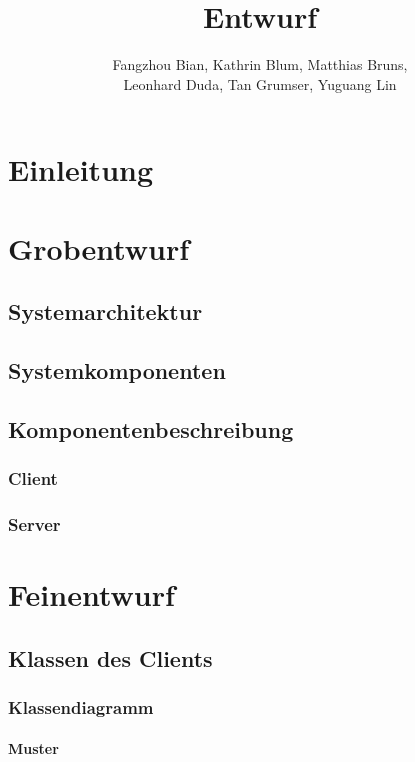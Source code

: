 \documentclass[a4paper]{scrreprt}
\begin{document}
\title{Entwurf}
\author{Fangzhou Bian, Kathrin Blum, Matthias Bruns, \\Leonhard Duda, Tan Grumser, Yuguang Lin}
\maketitle
\tableofcontents



\chapter{Einleitung}

\chapter{Grobentwurf}
\section{Systemarchitektur}
\section{Systemkomponenten}
\section{Komponentenbeschreibung}
\subsection{Client}
\subsection{Server}


\chapter{Feinentwurf}
\section{Klassen des Clients}
\subsection{Klassendiagramm}

\subsubsection{Muster}
\end{document}
